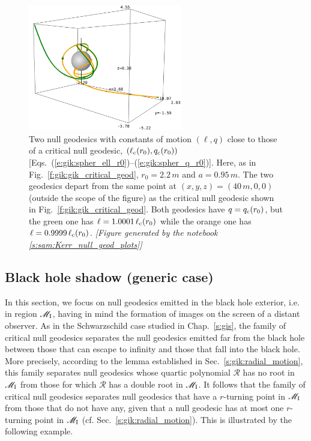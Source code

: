 \begin{figure}
\centerline{\includegraphics[width=0.6\textwidth]{gik_close_critical.png}}
\caption[]{\label{f:gik:close_critical} \footnotesize
Two null geodesics with constants of motion $(\ell,q)$ close
to those of a critical null
geodesic, $(\ell_{\rm c}(r_0),q_{\rm c}(r_0))$
[Eqs.~(\ref{e:gik:spher_ell_r0})--(\ref{e:gik:spher_q_r0})]. Here,
as in Fig.~\ref{f:gik:gik_critical_geod}, $r_0=2.2\, m$ and $a=0.95\, m$.
The two geodesics depart from the
same point at $(x,y,z)=(40\, m, 0, 0)$ (outside the scope of the figure)
as the critical null geodesic shown in Fig.~\ref{f:gik:gik_critical_geod}.
Both geodesics have $q = q_{\rm c}(r_0)$, but the green one
has $\ell = 1.0001\,\ell_{\rm c}(r_0)$
while the orange one has $\ell = 0.9999\,\ell_{\rm c}(r_0)$.
\textsl{[Figure generated by the notebook \ref{s:sam:Kerr_null_geod_plots}]}
}
\end{figure}



\subsection{Black hole shadow (generic case)} \label{s:gik:shadow_generic}

In this section, we focus on null geodesics emitted in the black hole
exterior, i.e. in region $\mathscr{M}_{\rm I}$, having in mind the formation
of images on the screen of a distant observer.
As in the Schwarzschild case studied in Chap.~\ref{s:gis}, the family
of critical null geodesics separates the null geodesics emitted far from the
black hole between those
that can escape to infinity and those that fall into the black hole.
More precisely, according to the lemma established in Sec.~\ref{s:gik:radial_motion},
this family separates null geodesics whose quartic polynomial $\mathscr{R}$
has no root in $\mathscr{M}_{\rm I}$ from those for which $\mathscr{R}$ has a double
root in $\mathscr{M}_{\rm I}$. It follows that the family of critical null
geodesics separates null geodesics that have a $r$-turning
point in $\mathscr{M}_{\rm I}$ from those that do not have any, given that a null geodesic has at most
one $r$-turning point in $\mathscr{M}_{\rm I}$ (cf. Sec.~\ref{s:gik:radial_motion}).
This is illustrated by the following example.

